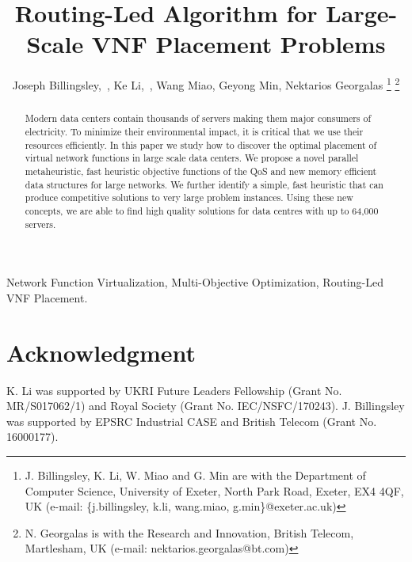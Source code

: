 \documentclass[journal]{IEEEtran}
\begin{document}
\title{Routing-Led Algorithm for Large-Scale VNF Placement Problems}

\author{
	Joseph Billingsley,~,
	Ke Li,~,
	Wang Miao,
	Geyong Min,
	Nektarios Georgalas
	\thanks{J. Billingsley, K. Li, W. Miao and G. Min are with the Department of Computer Science, University of Exeter, North Park Road, Exeter, EX4 4QF, UK (e-mail: \{j.billingsley, k.li, wang.miao, g.min\}@exeter.ac.uk)}
	\thanks{N. Georgalas is with the Research and Innovation, British Telecom, Martlesham, UK (e-mail: nektarios.georgalas@bt.com)}
}

\maketitle

\begin{abstract}
	Modern data centers contain thousands of servers making them major consumers of electricity. To minimize their environmental impact, it is critical that we use their resources efficiently. In this paper we study how to discover the optimal placement of virtual network functions in large scale data centers. We propose a novel parallel metaheuristic, fast heuristic objective functions of the QoS and new memory efficient data structures for large networks. We further identify a simple, fast heuristic that can produce competitive solutions to very large problem instances. Using these new concepts, we are able to find high quality solutions for data centres with up to 64,000 servers.
\end{abstract}

\begin{IEEEkeywords}
	Network Function Virtualization, Multi-Objective Optimization, Routing-Led VNF Placement.
\end{IEEEkeywords}
















\section*{Acknowledgment}
K. Li was supported by UKRI Future Leaders Fellowship (Grant No. MR/S017062/1) and Royal Society (Grant No. IEC/NSFC/170243). J. Billingsley was supported by EPSRC Industrial CASE and British Telecom (Grant No. 16000177).



\end{document}
